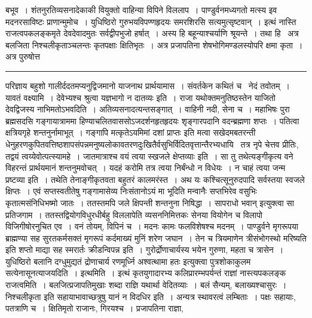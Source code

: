 \documentclass[11pt, openany]{book}
\begin{document}
\newpage

\noindent
बभूव~। शंतनुरतिव्यसनादेकाकी वियुक्तो वाहिन्या विपिने विललाप~। पाण्डुर्वनमध्यगतो मत्स्य इव मदनरसाविष्टः प्राणान्मुमोच~। युधिष्ठिरो गुरुभयविपण्णहृदयः समरशिरसि सत्यमुत्सृष्टवान्~। इत्थं नास्ति राजत्वपकलङ्कमृते देवदेवादमुतः सर्वद्वीपभुजो हर्षात्~। अस्य हि बहून्याश्चर्याणि श्रूयन्ते~। तथा हि \textendash\ अत्र बलजिता निश्चलीकृताञ्चलन्तः कृतपक्षाः क्षितिभृतः~। अत्र प्रजापतिना शेषभोगिमण्डलस्योपरि क्षमा कृता~। अत्र पुरुषोत्त\textendash

\vspace{2mm}
\hrule

\noindent
{\s परिज्ञाय बहुशो गालीर्ददतमप्यनुद्विजमानो याजनाथ प्रार्थयामास~। संवर्तकेन कथितं च \textendash\ {\qt नेदं तवोतम्~। यावतं वक्ष्यामि~। देवेभ्यश्च श्रुत्वा यज्ञभागो न दातव्यः} इति~। राजा यथोक्तमनुतिष्ठस्तेन याजितो देवद्विजस्य नाभिमतोऽभवदिति~। अतिव्यसनादत्यन्तसङ्गात्~। वाहिनी नदी, सेना च~। महाभिषः पुरा ब्रह्मसदसि गङ्गायात्राममा हिण्याचलितवाससोऽजदर्शनहृतहृदयः शृङ्गारपदानि वदन्ब्रह्मणा शप्तः~। पतित्वा क्षत्रियगृहे शन्तनुर्नामाभूत्~। गङ्गापि {\qt मत्कृतेऽयमिमां दशां प्राप्तः} इति मत्वा सखेदमबतरन्ती धेनुहरणकुपितवत्तिष्ठशापसंपन्नमनुष्यलोकावतरणदुःखितैर्वसुभिर्विदितवृत्तान्तैरभ्यधायि \textendash\ {\qt तत्र नृपे चेत्तव प्रीतिः, तद्वयं त्वय्येवोत्पत्स्यामहे~। जातमात्राश्च वयं त्वया स्खजले क्षेप्तव्याः} इति~। सा तु तथेत्यङ्गीकृत्य वने विहरन्तं प्रार्थयमानं शन्तनुमवोचत्~। {\qt यदहं करोमि तत्र त्वया निर्बंन्धो न विधेयः~। न चाहं त्वया जन्म प्रष्टव्या} इति~। तथेति तेनाङ्गीकृतवता बहुतरं कालमरंस्त~। अथ यः कश्चित्सूनुरुदपादि सर्वस्तया स्वजले क्षिप्तः~। एवं सप्तस्वतीतेषु गङ्गामासेव्य निःसंतानोऽयं मा भूदिति मन्वानैः सप्तभिरेव वसुभिः कृतात्मसंनिधिभष्मो जातः~। ततस्तमपि जले क्षिपन्ती शन्तनुना निषिद्धा~। {\qt सापराधो भवान्} इत्युक्त्वा सा प्रतिजगाम~। ततस्तद्वियोगविधुरधीर्बहु विललापेति व्यसननिमित्तकः सेनया वियोगेन च विलापो विजिगीषोरनुचित एव~। वनं तोयम्, विपिनं च~। मदनः कामः फलविशेषश्च मदनम्~। पाण्डुर्वने मृगरूपया ब्राह्मण्या सह सुरतकर्मसक्तं मृगरूपं कर्दमाख्यं मुनिं शरेण जघान~। तेन च त्रियमाणेन {\qt त्रीसंभोगस्थो मरिष्यति} इति शप्तो माद्या सह स्मरार्तः क्रीडन्विपन्न इति~। गुरोर्द्रोणाचार्यस्य भयेन गुरुणा, महता च त्रासेन~। युधिष्ठिरो बलानि दग्धुमुद्यतं द्रोणाचार्य रणमूर्ध्नि {\qt अश्वत्थामा हतः} इत्युक्त्वा पुत्रशोकाकुलम सत्येनासूनत्याजयदिति~। {\qtt इत्थमिति}~। इत्थं कृतयुगादारभ्य कलिप्रारम्भपर्यन्तं राज्ञां नास्त्यपकलङ्क राजत्वमिति~। बलजित्प्रजापतिमुखाः शब्दा राज्ञि यथार्था वेदितव्याः~। बलं सैन्यम्, बलाख्यश्चासुरः~। निश्चलीकृता इति सहायाभावाच्छत्रुषु यानं न विदधिर इति~। अन्यत्र स्थावरत्वं लम्बिताः~। पक्षः सहायाः, पतत्राणि च~। क्षितिमृतो राजानः, गिरयश्च~। प्रजापतिना राज्ञा,}
\end{document}
